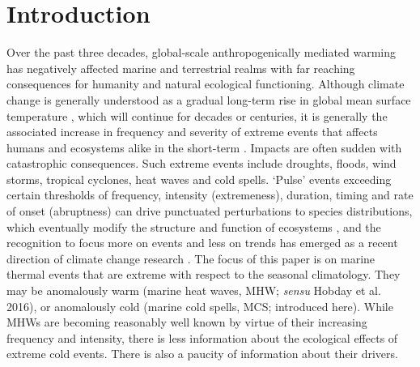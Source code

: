 \documentclass[a4paper,10pt,review]{elsarticle}
\begin{document}
\linenumbers

\section{Introduction}

Over the past three decades, global-scale anthropogenically mediated warming has negatively affected marine and terrestrial realms with far reaching consequences for humanity and natural ecological functioning. Although climate change is generally understood as a gradual long-term rise in global mean surface temperature \citep{IPCC2014}, which will continue for decades or centuries, it is generally the associated increase in frequency and severity of extreme events that affects humans and ecosystems alike in the short-term \citep{Easterling2000}. Impacts are often sudden with catastrophic consequences. Such extreme events include droughts, floods, wind storms, tropical cyclones, heat waves and cold spells. `Pulse' events exceeding certain thresholds of frequency, intensity (extremeness), duration, timing and rate of onset (abruptness) can drive punctuated perturbations to species distributions, which eventually modify the structure and function of ecosystems \citep{Wernberg2013, Rehage2016}, and the recognition to focus more on events and less on trends has emerged as a recent direction of climate change research \citep{Jentsch2007}. The focus of this paper is on marine thermal events that are extreme with respect to the seasonal climatology. They may be anomalously warm (marine heat waves, MHW; \emph{sensu} Hobday et al. 2016), or anomalously cold (marine cold spells, MCS; introduced here). While MHWs are becoming reasonably well known by virtue of their increasing frequency and intensity, there is less information about the ecological effects of extreme cold events. There is also a paucity of information about their drivers.
\end{document}
